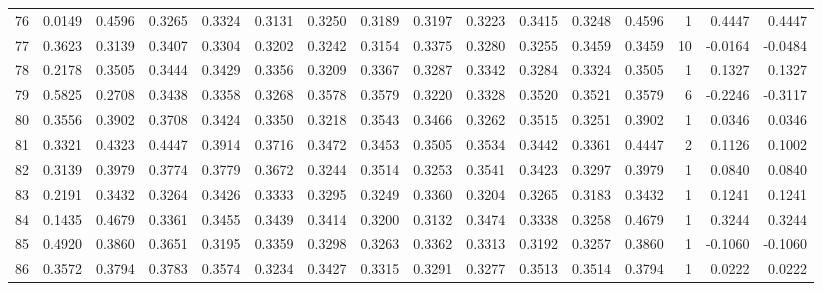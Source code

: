 \begin{tabular}{lrrrrrrrrrrrrrrr}
76  &      0.0149 &  0.4596 &  0.3265 &  0.3324 &  0.3131 &  0.3250 &  0.3189 &  0.3197 &  0.3223 &  0.3415 &   0.3248 &     0.4596 &      1 &                    0.4447 &                     0.4447 \\
77  &      0.3623 &  0.3139 &  0.3407 &  0.3304 &  0.3202 &  0.3242 &  0.3154 &  0.3375 &  0.3280 &  0.3255 &   0.3459 &     0.3459 &     10 &                   -0.0164 &                    -0.0484 \\
78  &      0.2178 &  0.3505 &  0.3444 &  0.3429 &  0.3356 &  0.3209 &  0.3367 &  0.3287 &  0.3342 &  0.3284 &   0.3324 &     0.3505 &      1 &                    0.1327 &                     0.1327 \\
79  &      0.5825 &  0.2708 &  0.3438 &  0.3358 &  0.3268 &  0.3578 &  0.3579 &  0.3220 &  0.3328 &  0.3520 &   0.3521 &     0.3579 &      6 &                   -0.2246 &                    -0.3117 \\
80  &      0.3556 &  0.3902 &  0.3708 &  0.3424 &  0.3350 &  0.3218 &  0.3543 &  0.3466 &  0.3262 &  0.3515 &   0.3251 &     0.3902 &      1 &                    0.0346 &                     0.0346 \\
81  &      0.3321 &  0.4323 &  0.4447 &  0.3914 &  0.3716 &  0.3472 &  0.3453 &  0.3505 &  0.3534 &  0.3442 &   0.3361 &     0.4447 &      2 &                    0.1126 &                     0.1002 \\
82  &      0.3139 &  0.3979 &  0.3774 &  0.3779 &  0.3672 &  0.3244 &  0.3514 &  0.3253 &  0.3541 &  0.3423 &   0.3297 &     0.3979 &      1 &                    0.0840 &                     0.0840 \\
83  &      0.2191 &  0.3432 &  0.3264 &  0.3426 &  0.3333 &  0.3295 &  0.3249 &  0.3360 &  0.3204 &  0.3265 &   0.3183 &     0.3432 &      1 &                    0.1241 &                     0.1241 \\
84  &      0.1435 &  0.4679 &  0.3361 &  0.3455 &  0.3439 &  0.3414 &  0.3200 &  0.3132 &  0.3474 &  0.3338 &   0.3258 &     0.4679 &      1 &                    0.3244 &                     0.3244 \\
85  &      0.4920 &  0.3860 &  0.3651 &  0.3195 &  0.3359 &  0.3298 &  0.3263 &  0.3362 &  0.3313 &  0.3192 &   0.3257 &     0.3860 &      1 &                   -0.1060 &                    -0.1060 \\
86  &      0.3572 &  0.3794 &  0.3783 &  0.3574 &  0.3234 &  0.3427 &  0.3315 &  0.3291 &  0.3277 &  0.3513 &   0.3514 &     0.3794 &      1 &                    0.0222 &                     0.0222 \\

\end{tabular}
